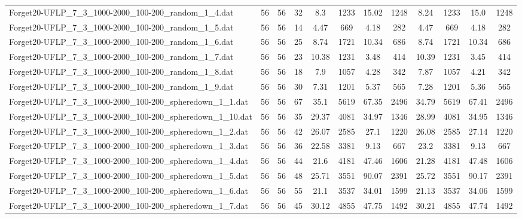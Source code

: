 \begin{sidewaystable}[!ht]
{\begin{tabular}{lccccccccccc}
Forget20-UFLP\_7\_3\_1000-2000\_100-200\_random\_1\_4.dat & 56 & 56 & 32 & 8.3 & 1233 & 15.02 & 1248 &  \textcolor{blue2}{8.24} & 1233 & 15.0 & 1248 \\
Forget20-UFLP\_7\_3\_1000-2000\_100-200\_random\_1\_5.dat & 56 & 56 & 14 & 4.47 & 669 &  \textcolor{blue2}{4.18} & 282 & 4.47 & 669 &  \textcolor{blue2}{4.18} & 282 \\
Forget20-UFLP\_7\_3\_1000-2000\_100-200\_random\_1\_6.dat & 56 & 56 & 25 &  \textcolor{blue2}{8.74} & 1721 & 10.34 & 686 &  \textcolor{blue2}{8.74} & 1721 & 10.34 & 686 \\
Forget20-UFLP\_7\_3\_1000-2000\_100-200\_random\_1\_7.dat & 56 & 56 & 23 & 10.38 & 1231 & 3.48 & 414 & 10.39 & 1231 &  \textcolor{blue2}{3.45} & 414 \\
Forget20-UFLP\_7\_3\_1000-2000\_100-200\_random\_1\_8.dat & 56 & 56 & 18 & 7.9 & 1057 & 4.28 & 342 & 7.87 & 1057 &  \textcolor{blue2}{4.21} & 342 \\
Forget20-UFLP\_7\_3\_1000-2000\_100-200\_random\_1\_9.dat & 56 & 56 & 30 & 7.31 & 1201 & 5.37 & 565 & 7.28 & 1201 &  \textcolor{blue2}{5.36} & 565 \\
Forget20-UFLP\_7\_3\_1000-2000\_100-200\_spheredown\_1\_1.dat & 56 & 56 & 67 & 35.1 & 5619 & 67.35 & 2496 &  \textcolor{blue2}{34.79} & 5619 & 67.41 & 2496 \\
Forget20-UFLP\_7\_3\_1000-2000\_100-200\_spheredown\_1\_10.dat & 56 & 56 & 35 & 29.37 & 4081 & 34.97 & 1346 &  \textcolor{blue2}{28.99} & 4081 & 34.95 & 1346 \\
Forget20-UFLP\_7\_3\_1000-2000\_100-200\_spheredown\_1\_2.dat & 56 & 56 & 42 & 26.07 & 2585 & 27.1 & 1220 & 26.08 & 2585 & 27.14 & 1220 \\
Forget20-UFLP\_7\_3\_1000-2000\_100-200\_spheredown\_1\_3.dat & 56 & 56 & 36 & 22.58 & 3381 &  \textcolor{blue2}{9.13} & 667 & 23.2 & 3381 &  \textcolor{blue2}{9.13} & 667 \\
Forget20-UFLP\_7\_3\_1000-2000\_100-200\_spheredown\_1\_4.dat & 56 & 56 & 44 & 21.6 & 4181 & 47.46 & 1606 & 21.28 & 4181 & 47.48 & 1606 \\
Forget20-UFLP\_7\_3\_1000-2000\_100-200\_spheredown\_1\_5.dat & 56 & 56 & 48 &  \textcolor{blue2}{25.71} & 3551 & 90.07 & 2391 & 25.72 & 3551 & 90.17 & 2391 \\
Forget20-UFLP\_7\_3\_1000-2000\_100-200\_spheredown\_1\_6.dat & 56 & 56 & 55 & 21.1 & 3537 & 34.01 & 1599 & 21.13 & 3537 & 34.06 & 1599 \\
Forget20-UFLP\_7\_3\_1000-2000\_100-200\_spheredown\_1\_7.dat & 56 & 56 & 45 & 30.12 & 4855 & 47.75 & 1492 & 30.21 & 4855 & 47.74 & 1492 \\

\end{tabular}}
\end{sidewaystable}
